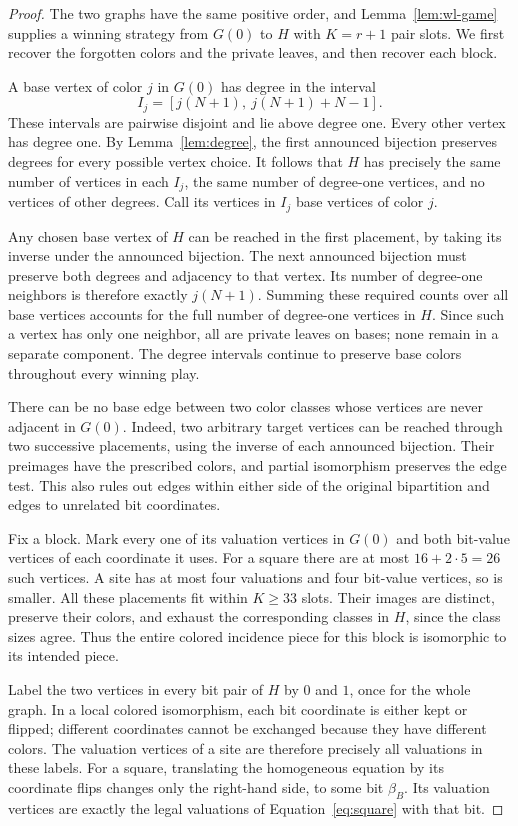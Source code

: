 \begin{proof}
The two graphs have the same positive order, and
Lemma~\ref{lem:wl-game} supplies a winning strategy from $G(0)$ to
$H$ with $K=r+1$ pair slots. We first recover the forgotten colors
and the private leaves, and then recover each block.

A base vertex of color $j$ in $G(0)$ has degree in the interval
\[
I_j=[j(N+1),\ j(N+1)+N-1].
\]
These intervals are pairwise disjoint and lie above degree one.
Every other vertex has degree one. By Lemma~\ref{lem:degree}, the
first announced bijection preserves degrees for every possible
vertex choice. It follows that $H$ has precisely the same number
of vertices in each $I_j$, the same number of degree-one vertices,
and no vertices of other degrees. Call its vertices in $I_j$ base
vertices of color $j$.

Any chosen base vertex of $H$ can be reached in the first
placement, by taking its inverse under the announced bijection.
The next announced bijection must preserve both degrees and
adjacency to that vertex. Its number of degree-one neighbors is
therefore exactly $j(N+1)$. Summing these required counts over
all base vertices accounts for the full number of degree-one
vertices in $H$. Since such a vertex has only one neighbor, all
are private leaves on bases; none remain in a separate component.
The degree intervals continue to preserve base colors throughout
every winning play.

There can be no base edge between two color classes whose vertices
are never adjacent in $G(0)$. Indeed, two arbitrary target vertices
can be reached through two successive placements, using the
inverse of each announced bijection. Their preimages have the
prescribed colors, and partial isomorphism preserves the edge
test. This also rules out edges within either side of the original
bipartition and edges to unrelated bit coordinates.

Fix a block. Mark every one of its valuation vertices in $G(0)$
and both bit-value vertices of each coordinate it uses. For a
square there are at most $16+2\cdot 5=26$ such vertices. A site
has at most four valuations and four bit-value vertices, so is
smaller. All these placements fit within $K\ge 33$ slots. Their
images are distinct, preserve their colors, and exhaust the
corresponding classes in $H$, since the class sizes agree. Thus
the entire colored incidence piece for this block is isomorphic
to its intended piece.

Label the two vertices in every bit pair of $H$ by $0$ and $1$,
once for the whole graph. In a local colored isomorphism, each
bit coordinate is either kept or flipped; different coordinates
cannot be exchanged because they have different colors. The
valuation vertices of a site are therefore precisely all
valuations in these labels. For a square, translating the
homogeneous equation by its coordinate flips changes only the
right-hand side, to some bit $\beta_B$. Its valuation vertices
are exactly the legal valuations of
Equation~\eqref{eq:square} with that bit.


\end{proof}
